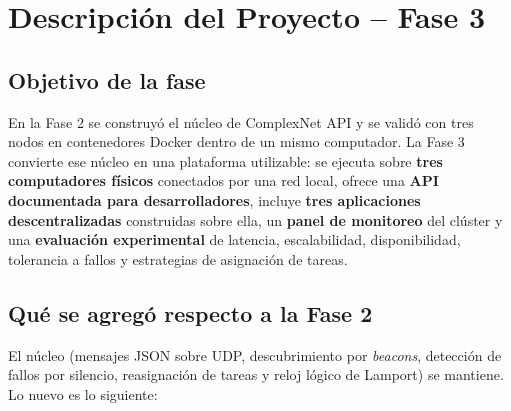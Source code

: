 %
%         

\section{Descripción del Proyecto -- Fase 3}

\subsection{Objetivo de la fase}

En la Fase 2 se construyó el núcleo de ComplexNet API y se validó con tres nodos en contenedores
Docker dentro de un mismo computador. La Fase 3 convierte ese núcleo en una plataforma utilizable:
se ejecuta sobre \textbf{tres computadores físicos} conectados por una red local, ofrece una
\textbf{API documentada para desarrolladores}, incluye \textbf{tres aplicaciones descentralizadas}
construidas sobre ella, un \textbf{panel de monitoreo} del clúster y una \textbf{evaluación
experimental} de latencia, escalabilidad, disponibilidad, tolerancia a fallos y estrategias de
asignación de tareas.

\subsection{Qué se agregó respecto a la Fase 2}

El núcleo (mensajes JSON sobre UDP, descubrimiento por \emph{beacons}, detección de fallos por
silencio, reasignación de tareas y reloj lógico de Lamport) se mantiene. Lo nuevo es lo siguiente:

